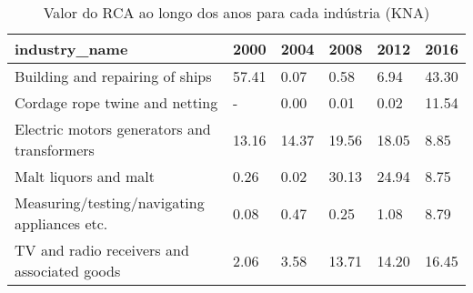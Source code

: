 \begin{table}
\centering
\caption{Valor do RCA ao longo dos anos para cada indústria (KNA)}
\begin{tabular}{p{6cm}p{1.5cm}p{1.5cm}p{1.5cm}p{1.5cm}p{1.5cm}}
\toprule
                               industry\_name &  2000 &  2004 &  2008 &  2012 &  2016 \\
\midrule
             Building and repairing of ships & 57.41 &  0.07 &  0.58 &  6.94 & 43.30 \\
              Cordage rope twine and netting &     - &  0.00 &  0.01 &  0.02 & 11.54 \\
 Electric motors generators and transformers & 13.16 & 14.37 & 19.56 & 18.05 &  8.85 \\
                       Malt liquors and malt &  0.26 &  0.02 & 30.13 & 24.94 &  8.75 \\
Measuring/testing/navigating appliances etc. &  0.08 &  0.47 &  0.25 &  1.08 &  8.79 \\
 TV and radio receivers and associated goods &  2.06 &  3.58 & 13.71 & 14.20 & 16.45 \\
\bottomrule
\end{tabular}
\end{table}
